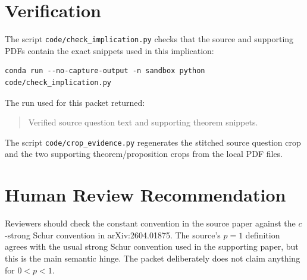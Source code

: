 \documentclass[11pt]{article}
\theoremstyle{remark}
\begin{document}
\section{Verification}

The script \texttt{code/check\_implication.py} checks that the source and
supporting PDFs contain the exact snippets used in this implication:

\begin{verbatim}
conda run --no-capture-output -n sandbox python code/check_implication.py
\end{verbatim}

The run used for this packet returned:

\begin{quote}
Verified source question text and supporting theorem snippets.
\end{quote}

The script \texttt{code/crop\_evidence.py} regenerates the stitched source
question crop and the two supporting theorem/proposition crops from the local
PDF files.

\section{Human Review Recommendation}

Reviewers should check the constant convention in the source paper against
the \(c\)-strong Schur convention in arXiv:2604.01875.  The source's \(p=1\)
definition agrees with the usual strong Schur convention used in the
supporting paper, but this is the main semantic hinge.  The packet deliberately
does not claim anything for \(0<p<1\).
\end{document}
